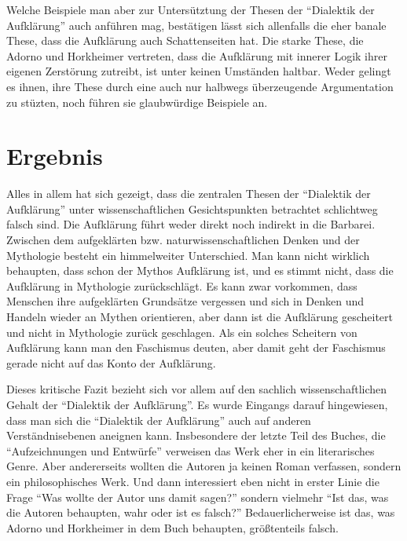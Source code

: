 \documentclass[12pt,a4paper,ngerman]{article}
\begin{document}
Welche Beispiele man aber zur Untersütztung der Thesen der "`Dialektik der
Aufklärung"' auch anführen mag, bestätigen lässt sich allenfalls die eher
banale These, dass die Aufklärung auch Schattenseiten hat. Die starke These,
die Adorno und Horkheimer vertreten, dass die Aufklärung mit innerer Logik
ihrer eigenen Zerstörung zutreibt, ist unter keinen Umständen haltbar. Weder
gelingt es ihnen, ihre These durch eine auch nur halbwegs überzeugende
Argumentation zu stüzten, noch führen sie glaubwürdige Beispiele an. 

\section{Ergebnis}

Alles in allem hat sich gezeigt, dass die zentralen Thesen der "`Dialektik der
Aufklärung"' unter wissenschaftlichen Gesichtspunkten betrachtet schlichtweg
falsch sind. Die Aufklärung führt weder direkt noch indirekt in die
Barbarei. Zwischen dem aufgeklärten bzw. naturwissenschaftlichen Denken und
der Mythologie besteht ein himmelweiter Unterschied. Man kann nicht wirklich
behaupten, dass schon der Mythos Aufklärung ist, und es stimmt nicht, dass die
Aufklärung in Mythologie zurückschlägt. Es kann zwar vorkommen, dass Menschen
ihre aufgeklärten Grundsätze vergessen und sich in Denken und Handeln wieder
an Mythen orientieren, aber dann ist die Aufklärung gescheitert und nicht in
Mythologie zurück geschlagen. Als ein solches Scheitern von Aufklärung kann
man den Faschismus deuten, aber damit geht der Faschismus gerade nicht auf das
Konto der Aufklärung. 

Dieses kritische Fazit bezieht sich vor allem auf den sachlich
wissenschaftlichen Gehalt der "`Dialektik der Aufklärung"'. Es wurde
Eingangs darauf hingewiesen, dass man sich die "`Dialektik der
Aufklärung"' auch auf anderen Verständnisebenen aneignen
kann. Insbesondere der letzte Teil des Buches, die "`Aufzeichnungen
und Entwürfe"' \cite[S. 218 - 275]{adorno-horkheimer:1947} verweisen
das Werk eher in ein literarisches Genre. Aber andererseits wollten
die Autoren ja keinen Roman verfassen, sondern ein philosophisches
Werk. Und dann interessiert eben nicht in erster Linie die Frage "`Was
wollte der Autor uns damit sagen?"' sondern vielmehr "`Ist das, was
die Autoren behaupten, wahr oder ist es falsch?"' Bedauerlicherweise
ist das, was Adorno und Horkheimer in dem Buch behaupten, größtenteils
falsch. 
\end{document}
